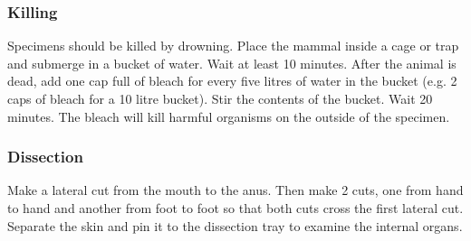 \subsubsection{Killing}
Specimens should be killed by drowning. Place the mammal inside a cage or trap and submerge in a bucket of water. Wait at least 10 minutes. After the animal is dead, add one cap full of bleach for every five litres of water in the bucket (e.g. 2 caps of bleach for a 10 litre bucket). Stir the contents of the bucket. Wait 20 minutes. The bleach will kill harmful organisms on the outside of the specimen.

\subsubsection{Dissection}
Make a lateral cut from the mouth to the anus. Then make 2 cuts, one from hand to hand and another from foot to foot so that both cuts cross the first lateral cut. Separate the skin and pin it to the dissection tray to examine the internal organs.
